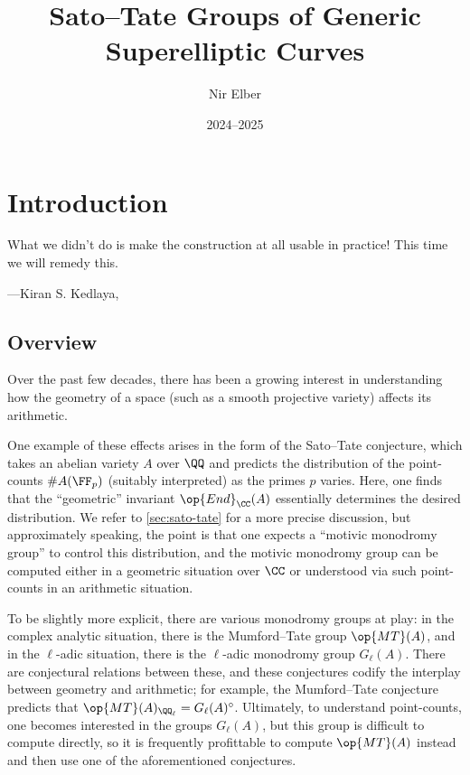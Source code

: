 \documentclass[openany]{book}
\title{Sato--Tate Groups of Generic Superelliptic Curves}
\author{Nir Elber}
\date{2024--2025}
\begin{document}
\maketitle

\nirtableofcontents

\newpage

\setcounter{chapter}{-1}
\chapter{Introduction}

\epigraph{What we didn't do is make the construction at all usable in practice! This time we will remedy this.}
{---Kiran S. Kedlaya, \cite{kedlaya-cft}}

\section{Overview}
Over the past few decades, there has been a growing interest in understanding how the geometry of a space (such as a smooth projective variety) affects its arithmetic.

One example of these effects arises in the form of the Sato--Tate conjecture, which takes an abelian variety $A$ over $\QQ$ and predicts the distribution of the point-counts $\#A(\FF_p)$ (suitably interpreted) as the primes $p$ varies. Here, one finds that the ``geometric'' invariant $\op{End}_\CC(A)$ essentially determines the desired distribution. We refer to \cref{sec:sato-tate} for a more precise discussion, but approximately speaking, the point is that one expects a ``motivic monodromy group'' to control this distribution, and the motivic monodromy group can be computed either in a geometric situation over $\CC$ or understood via such point-counts in an arithmetic situation.

To be slightly more explicit, there are various monodromy groups at play: in the complex analytic situation, there is the Mumford--Tate group $\op{MT}(A)$, and in the $\ell$-adic situation, there is the $\ell$-adic monodromy group $G_\ell(A)$. There are conjectural relations between these, and these conjectures codify the interplay between geometry and arithmetic; for example, the Mumford--Tate conjecture predicts that $\op{MT}(A)_{\QQ_\ell}=G_\ell(A)^\circ$. Ultimately, to understand point-counts, one becomes interested in the groups $G_\ell(A)$, but this group is difficult to compute directly, so it is frequently profittable to compute $\op{MT}(A)$ instead and then use one of the aforementioned conjectures.
\end{document}
